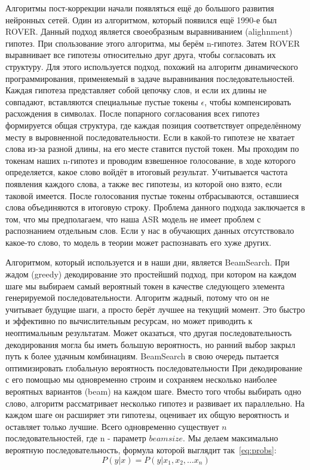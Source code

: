 Алгоритмы пост-коррекции начали появляться ещё до большого развития нейронных сетей.
Один из алгоритмом, который появился ещё 1990-е был ROVER\cite{fiscus1997post}.
Данный подход является своеобразным выравниванием (alighnment) гипотез.
При спользование этого алгоритма, мы берём n-гипотез. 
Затем ROVER выравнивает все гипотезы относительно друг друга, чтобы согласовать их структуру.
Для этого используется подход, похожий на алгоритм динамического программирования, применяемый в задаче выравнивания последовательностей.
Каждая гипотеза представляет собой цепочку слов, и если их длины не совпадают, вставляются специальные пустые токены $\epsilon$, чтобы компенсировать расхождения в символах.
После попарного согласования всех гипотез формируется общая структура, где каждая позиция соответствует определённому месту в выровненной последовательности.
Если в какой-то гипотезе не хватает слова из-за разной длины, на его месте ставится пустой токен.
Мы проходим по токенам наших n-гипотез и проводим взвешенное голосование, в ходе которого определяется, какое слово войдёт в итоговый результат.
Учитывается частота появления каждого слова, а также вес гипотезы, из которой оно взято, если таковой имеется.
После голосования пустые токены отбрасываются, оставшиеся слова объединяются в итоговую строку.
Проблема данного подхода заключается в том, что мы предполагаем, что наша ASR модель не имеет проблем с распознанием отдельным слов.
Если у нас в обучающих данных отсутствовало какое-то слово, то модель в теории может распознавать его хуже других.

Алгоритмом, который используется и в наши дни, является BeamSearch\cite{freitag2017beam}.
При жадом (greedy) декодирование это простейший подход, при котором на каждом шаге мы выбираем самый вероятный токен в качестве следующего элемента генерируемой последовательности.
Алгоритм жадный, потому что он не учитывает будущие шаги, а просто берёт лучшее на текущий момент.
Это быстро и эффективно по вычислительным ресурсам, но может приводить к неоптимальным результатам.
Может оказаться, что другая последовательность декодирования могла бы иметь большую вероятность, но ранний выбор закрыл путь к более удачным комбинациям.
BeamSearch в свою очередь пытается оптимизировать глобальную вероятность последовательности
При декодирование с его помощью мы одновременно строим и сохраняем несколько наиболее вероятных вариантов (beam) на каждом шаге.
Вместо того чтобы выбирать одно слово, алгоритм рассматривает несколько гипотез и развивает их параллельно.
На каждом шаге он расширяет эти гипотезы, оценивает их общую вероятность и оставляет только лучшие.
Всего одновременно существует $n$ последовательностей, где n - параметр $beam size$.
Мы делаем максимально вероятную последовательность, формула которой выглядит так~\ref{eq:probs}:
\begin{equation}
  P(y|x) = P(y|x_1,x_2,\dots x_n)
  \label{eq:probs}
\end{equation}

